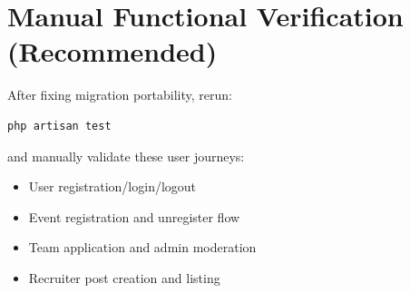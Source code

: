 \section{Manual Functional Verification (Recommended)}
After fixing migration portability, rerun:
\begin{verbatim}
php artisan test
\end{verbatim}
and manually validate these user journeys:
\begin{itemize}
    \item User registration/login/logout
    \item Event registration and unregister flow
    \item Team application and admin moderation
    \item Recruiter post creation and listing
\end{itemize}
